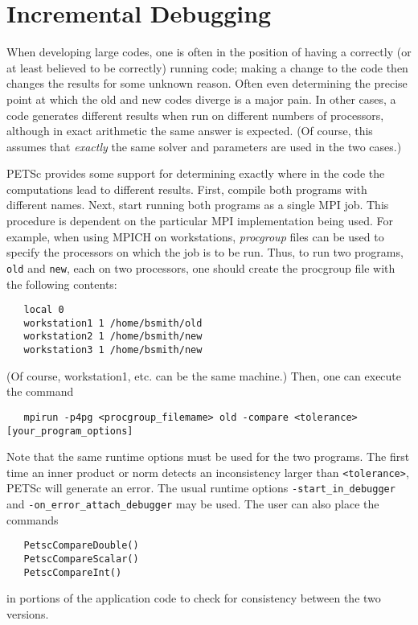 \section{Incremental Debugging} 

When developing large codes, one is often in the position of having a
correctly (or at least believed to be correctly) running code; making
a change to the code then changes the results for some unknown reason.
Often even determining the precise point at which the old and new
codes diverge is a major pain.  In other cases, a code generates
different results when run on different numbers of processors,
although in exact arithmetic the same answer is expected. (Of course,
this assumes that {\em exactly} the same solver and parameters are
used in the two cases.)
 
PETSc provides some support for determining exactly where in the code
the computations lead to different results. First, compile both programs
with different names.  Next, start running
both programs as a single MPI job. This procedure is dependent on the particular
MPI implementation being used.
For example, when using MPICH on workstations, 
{\em procgroup} files can be used to specify the processors on which the job is
to be run.  Thus, to run two programs, {\tt old} and {\tt new},
each on two processors, one should create the procgroup file with the
following contents:
\begin{verbatim}
   local 0
   workstation1 1 /home/bsmith/old
   workstation2 1 /home/bsmith/new
   workstation3 1 /home/bsmith/new
\end{verbatim}
(Of course, workstation1, etc. can be the same machine.) Then, one can
execute the command
\begin{verbatim}
   mpirun -p4pg <procgroup_filemame> old -compare <tolerance> [your_program_options]
\end{verbatim}
Note that the same runtime options must be used for the two programs.
The first time an inner product or norm detects an inconsistency larger
than {\tt <tolerance>}, PETSc will generate an error. The usual runtime
options {\tt -start\_in\_debugger} and {\tt -on\_error\_attach\_debugger} may 
be used.   The user can also place the commands 
\begin{verbatim}
   PetscCompareDouble()
   PetscCompareScalar()
   PetscCompareInt()
\end{verbatim}
  
in portions of the application code to check for consistency between
the two versions.
 
